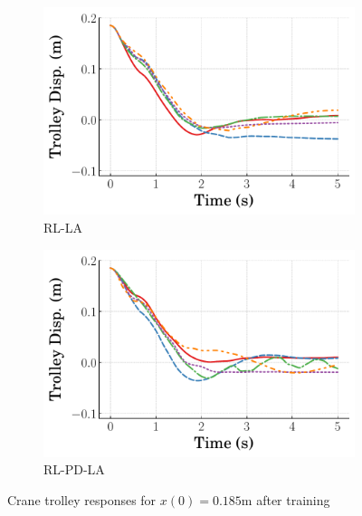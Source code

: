 \begin{figure}[tb]
    \hfill
    \begin{subfigure}[b]{0.49\textwidth}
        \centering
        \includegraphics[width=\textwidth]{figures/figures_RL_model_based_control/time_responses_crane/dpcrane_RL_LA/Cart_displacement_0p185_init_300000_steps.pdf}
        \caption{RL-LA}
        \label{subfig_chap2:dpcrane_trolley_resp_300000steps_RL_LA}
    \end{subfigure}
    \hfill
    \begin{subfigure}[b]{0.49\textwidth}
        \centering
        \includegraphics[width=\textwidth]{figures/figures_RL_model_based_control/time_responses_crane/dpcrane_RL_PD_LA/Cart_displacement_0p185_init_300000_steps.pdf}
        \caption{RL-PD-LA}
        \label{subfig_chap2:dpcrane_trolley_resp_300000steps_RL_PD_LA}
    \end{subfigure}
    \hfill
    \caption{Crane trolley responses for $x(0)=0.185\si{\meter}$ after training}
    \label{fig_chap2:dpcrane_trolley_resp_300000steps}
\end{figure}
